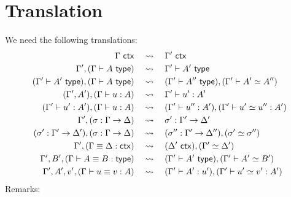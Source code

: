 
\section{Translation}
\label{sec:translation}

We need the following translations:
%
\begin{align}
  \label{lbl:ctx-ctr}
  \Gamma\ \mathsf{ctx}
  &\quad\leadsto\quad
  \Gamma'\ \mathsf{ctx}
  \\
  \label{lbl:ty-ctr}
  \Gamma', (\Gamma \vdash A \ \mathsf{type})
  &\quad\leadsto\quad
  \Gamma' \vdash A' \ \mathsf{type}
  \\
  \label{lbl:ty-path}
  (\Gamma' \vdash A' \ \mathsf{type}), (\Gamma \vdash A \ \mathsf{type})
  &\quad\leadsto\quad
  (\Gamma' \vdash A'' \ \mathsf{type}), (\Gamma' \vdash A' \simeq A'')
  \\
  \label{lbl:term-ctr}
  (\Gamma', A'), (\Gamma \vdash u : A)
  &\quad\leadsto\quad
  \Gamma' \vdash u' : A'
  \\
  \label{lbl:term-path}
  (\Gamma' \vdash u' : A'), (\Gamma \vdash u : A)
  &\quad\leadsto\quad
  (\Gamma' \vdash u'' : A'), (\Gamma' \vdash u' \simeq u'' : A')
  \\
  \label{lbl:subst-ctr}
  \Gamma', (\sigma : \Gamma \to \Delta)
  &\quad\leadsto\quad
  \sigma' : \Gamma' \to \Delta'
  \\
  \label{lbl:subst-path}
  (\sigma' : \Gamma' \to \Delta'), (\sigma : \Gamma \to \Delta)
  &\quad\leadsto\quad
  (\sigma'' : \Gamma' \to \Delta''), (\sigma' \simeq \sigma'')
  \\
  \label{lbl:eq-ctx-path}
  \Gamma', (\Gamma \equiv \Delta : \mathsf{ctx})
  &\quad\leadsto\quad
  (\Delta'\ \mathsf{ctx}), (\Gamma' \simeq \Delta')
  \\
  \label{lbl:eq-ty-path}
  \Gamma', B', (\Gamma \vdash A \equiv B : \mathsf{type})
  &\quad\leadsto\quad
  (\Gamma' \vdash A' \ \mathsf{type}), (\Gamma' \vdash A' \simeq B')
  \\
  \label{lbl:eq-term-path}
  \Gamma', A', v', (\Gamma \vdash u \equiv v : A)
  &\quad\leadsto\quad
  (\Gamma' \vdash A' : u'), (\Gamma' \vdash u' \simeq v' : A')
\end{align}
%
Remarks:
%
